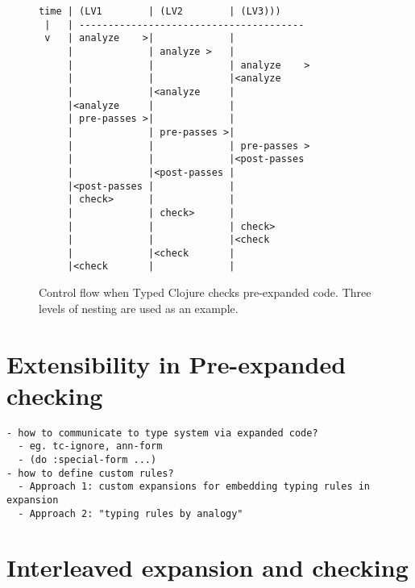 \begin{figure*}
\singlespacing
\begin{verbatim}
time | (LV1        | (LV2        | (LV3)))
 |   | ---------------------------------------
 v   | analyze    >|             |
     |             | analyze >   |
     |             |             | analyze    >
     |             |             |<analyze
     |             |<analyze     |
     |<analyze     |             |
     | pre-passes >|             |
     |             | pre-passes >|
     |             |             | pre-passes >
     |             |             |<post-passes
     |             |<post-passes |
     |<post-passes |             |
     | check>      |             |
     |             | check>      |
     |             |             | check>
     |             |             |<check
     |             |<check       |
     |<check       |             |
\end{verbatim}
  \caption{Control flow when Typed Clojure checks pre-expanded code.
  Three levels of nesting are used as an example.
  }
  \label{fig:analyzer:control-flow-pre-expand}
\end{figure*}

\chapter{Extensibility in Pre-expanded checking}

{
\singlespacing
\begin{verbatim}
- how to communicate to type system via expanded code?
  - eg. tc-ignore, ann-form
  - (do :special-form ...)
- how to define custom rules?
  - Approach 1: custom expansions for embedding typing rules in expansion
  - Approach 2: "typing rules by analogy"
\end{verbatim}
}

\chapter{Interleaved expansion and checking}


